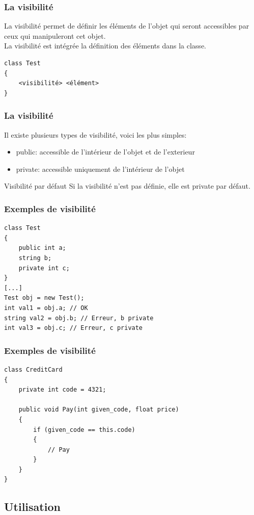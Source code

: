 \documentclass{beamer}
\begin{document}
\begin{frame}[fragile]
\frametitle{La visibilité}
La visibilité permet de définir les éléments de l'objet qui seront accessibles par ceux qui manipuleront cet objet.\\
La visibilité est intégrée la définition des éléments dans la classe.\\
\begin{lstlisting}
class Test
{
    <visibilité> <élément>
}
\end{lstlisting}
\end{frame}

\begin{frame}
\frametitle{La visibilité}
Il existe plusieurs types de visibilité, voici les plus simples:
\begin{itemize}
\item public: accessible de l'intérieur de l'objet et de l'exterieur
\item private: accessible uniquement de l'intérieur de l'objet
\end{itemize}
\begin{alertblock}{Visibilité par défaut}
Si la visibilité n'est pas définie, elle est private par défaut.
\end{alertblock}
\end{frame}

\begin{frame}[fragile]
\frametitle{Exemples de visibilité}
\begin{lstlisting}
class Test
{
    public int a;
    string b;
    private int c;
}
[...]
Test obj = new Test();
int val1 = obj.a; // OK
string val2 = obj.b; // Erreur, b private
int val3 = obj.c; // Erreur, c private
\end{lstlisting}

\end{frame}

\begin{frame}[fragile]
\frametitle{Exemples de visibilité}
\begin{lstlisting}
class CreditCard
{
    private int code = 4321;
    
    public void Pay(int given_code, float price)
    {
        if (given_code == this.code)
        {
            // Pay
        }
    }
}
\end{lstlisting}
\end{frame}

\subsection{Utilisation}
\end{document}
